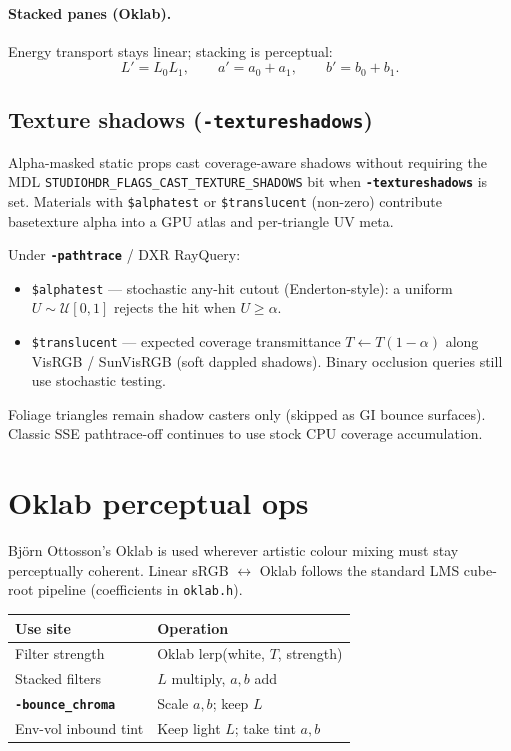 \documentclass[11pt,a4paper]{article}
\newcommand{\flag}[1]{\texttt{\bfseries #1}}
\newcommand{\vmt}[1]{\texttt{\$#1}}
\newcommand{\code}[1]{\texttt{#1}}
\begin{document}
\paragraph{Stacked panes (Oklab).}
Energy transport stays linear; stacking is perceptual:
\begin{equation}
  L'=L_0 L_1,
  \qquad
  a'=a_0+a_1,
  \qquad
  b'=b_0+b_1.
\end{equation}

\subsection{Texture shadows (\flag{-textureshadows})}
\label{sec:texshadow}

Alpha-masked static props cast coverage-aware shadows without requiring the
MDL \code{STUDIOHDR\_FLAGS\_CAST\_TEXTURE\_SHADOWS} bit when
\flag{-textureshadows} is set. Materials with \vmt{alphatest} or
\vmt{translucent} (non-zero) contribute basetexture alpha into a GPU atlas
and per-triangle UV meta.

Under \flag{-pathtrace} / DXR RayQuery:
\begin{itemize}[leftmargin=1.4em]
  \item \vmt{alphatest} --- stochastic any-hit cutout (Enderton-style): a
        uniform $U\sim\mathcal{U}[0,1]$ rejects the hit when $U\ge\alpha$.
  \item \vmt{translucent} --- expected coverage transmittance
        $T\leftarrow T(1-\alpha)$ along VisRGB / SunVisRGB (soft dappled
        shadows). Binary occlusion queries still use stochastic testing.
\end{itemize}
Foliage triangles remain shadow casters only (skipped as GI bounce surfaces).
Classic SSE pathtrace-off continues to use stock CPU coverage accumulation.

\section{Oklab perceptual ops}
\label{sec:oklab}

Björn Ottosson's Oklab is used wherever artistic colour mixing must stay
perceptually coherent. Linear sRGB $\leftrightarrow$ Oklab follows the standard
LMS cube-root pipeline (coefficients in \code{oklab.h}).

\begin{center}
\begin{tabular}{@{}ll@{}}
  \toprule
  Use site & Operation \\
  \midrule
  Filter strength & Oklab lerp(white, $T$, strength) \\
  Stacked filters & $L$ multiply, $a,b$ add \\
  \flag{-bounce\_chroma} & Scale $a,b$; keep $L$ \\
  Env-vol inbound tint & Keep light $L$; take tint $a,b$ \\
  \bottomrule
\end{tabular}
\end{center}
\end{document}
